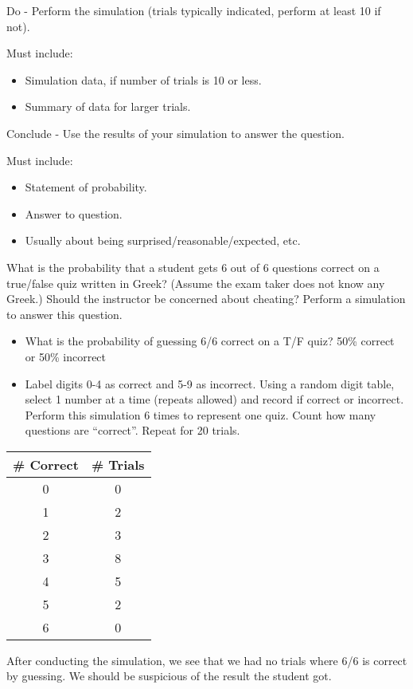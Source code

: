 \documentclass[../stats.tex]{subfiles}
\begin{document}
Do - Perform the simulation (trials typically indicated, perform at least 10 if not).

Must include:
\begin{itemize}
    \item Simulation data, if number of trials is 10 or less.
    \item Summary of data for larger trials.
\end{itemize}

Conclude - Use the results of your simulation to answer the question.

Must include:
\begin{itemize}
    \item Statement of probability.
    \item Answer to question.
    \item Usually about being surprised/reasonable/expected, etc.
\end{itemize}

\begin{example}
    What is the probability that a student gets 6 out of 6 questions correct on a true/false quiz written in Greek? (Assume the exam taker does not know any Greek.) Should the instructor be concerned about cheating? Perform a simulation to answer this question.

    \begin{itemize}
        \item What is the probability of guessing 6/6 correct on a T/F quiz?
        50\% correct or 50\% incorrect 
        \item Label digits 0-4 as correct and 5-9 as incorrect. Using a random digit table, select 1 number at a time (repeats allowed) and record if correct or incorrect. Perform this simulation 6 times to represent one quiz. Count how many questions are ``correct''. Repeat for 20 trials.
    \end{itemize}
    \begin{center}
        \begin{tabular}{c|c}
            \# Correct & \# Trials \\\hline 
            0 & 0\\
            1&2\\
            2&3\\
            3&8\\
            4&5\\
            5&2\\
            6&0
        \end{tabular}
    \end{center}
    After conducting the simulation, we see that we had no trials where 6/6 is correct by guessing. We should be suspicious of the result the student got.
\end{example}
\pagebreak 
\end{document}
